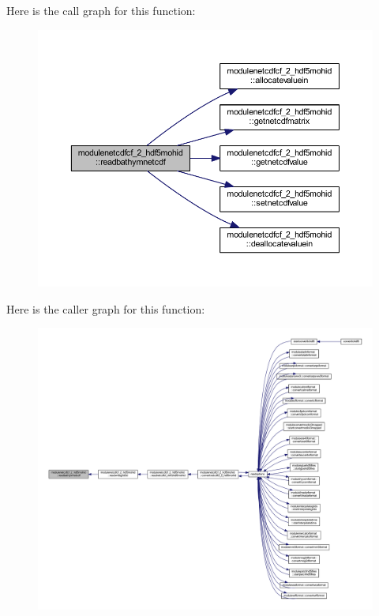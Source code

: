 Here is the call graph for this function\+:\nopagebreak
\begin{figure}[H]
\begin{center}
\leavevmode
\includegraphics[width=350pt]{namespacemodulenetcdfcf__2__hdf5mohid_af7f83fb951c020a987c7376d899f56e1_cgraph}
\end{center}
\end{figure}
Here is the caller graph for this function\+:\nopagebreak
\begin{figure}[H]
\begin{center}
\leavevmode
\includegraphics[width=350pt]{namespacemodulenetcdfcf__2__hdf5mohid_af7f83fb951c020a987c7376d899f56e1_icgraph}
\end{center}
\end{figure}
\mbox{\label{namespacemodulenetcdfcf__2__hdf5mohid_af3d93c43025a8ea4bfc12e430d456ac3}} 
